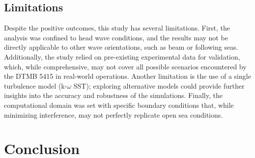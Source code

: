 \documentclass[12pt]{article} %
\begin{document}
\subsection{Limitations}
Despite the positive outcomes, this study has several limitations. First, the analysis was 
confined to head wave conditions, and the results may not be directly applicable to other wave 
orientations, such as beam or following seas. Additionally, the study relied on pre-existing 
experimental data for validation, which, while comprehensive, may not cover all possible 
scenarios encountered by the DTMB 5415 in real-world operations. Another limitation is the 
use of a single turbulence model (k-$\omega$ SST); exploring alternative models could provide further 
insights into the accuracy and robustness of the simulations. Finally, the computational 
domain was set with specific boundary conditions that, while minimizing interference, may not 
perfectly replicate open sea conditions.


\section{Conclusion}
\end{document}
